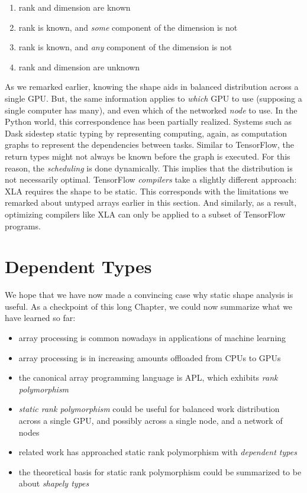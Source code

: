 \documentclass{report}
\begin{document}
\begin{enumerate}
    \item rank and dimension are known
    \item rank is known, and \emph{some} component of the dimension is not
    \item rank is known, and \emph{any} component of the dimension is not
    \item rank and dimension are unknown
\end{enumerate}

As we remarked earlier, knowing the shape aids in balanced distribution across a single GPU. But, the same information applies to \emph{which} GPU to use (supposing a single computer has many), and even which of the networked \emph{node} to use. In the Python world, this correspondence has been partially realized. Systems such as Dask sidestep static typing by representing computing, again, as computation graphs to represent the dependencies between tasks. Similar to TensorFlow, the return types might not always be known before the graph is executed. For this reason, the \emph{scheduling} is done dynamically. This implies that the distribution is not necessarily optimal. TensorFlow \emph{compilers} take a slightly different approach: XLA requires the shape to be static. This corresponds with the limitations we remarked about untyped arrays earlier in this section. And similarly, as a result, optimizing compilers like XLA can only be applied to a subset of TensorFlow programs.

\section{Dependent Types}



We hope that we have now made a convincing case why static shape analysis is useful. As a checkpoint of this long Chapter, we could now summarize what we have learned so far:

\begin{itemize}
  \item array processing is common nowadays in applications of machine learning
  \item array processing is in increasing amounts offloaded from CPUs to GPUs
  \item the canonical array programming language is APL, which exhibits \emph{rank polymorphism}
  \item \emph{static rank polymorphism} could be useful for balanced work distribution across a single GPU, and possibly across a single node, and a network of nodes
  \item related work has approached static rank polymorphism with \emph{dependent types}
  \item the theoretical basis for static rank polymorphism could be summarized to be about \emph{shapely types}
\end{itemize}
\end{document}
